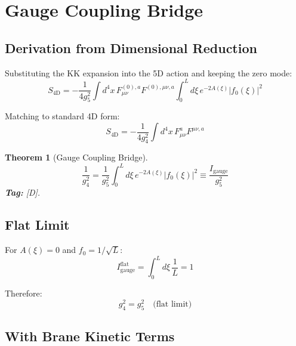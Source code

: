 \documentclass[11pt,a4paper]{article}
\newtheorem{theorem}{Theorem}[section]
\begin{document}
\section{Gauge Coupling Bridge}
\label{sec:coupling-bridge}

\subsection{Derivation from Dimensional Reduction}

Substituting the KK expansion into the 5D action and keeping the zero mode:
\begin{equation}
  S_{\text{4D}} = -\frac{1}{4g_5^2} \int d^4x \, F_{\mu\nu}^{(0),a} F^{(0),\mu\nu,a}
    \int_0^L d\xi \, e^{-2A(\xi)} |f_0(\xi)|^2
  \label{eq:4d-action-raw}
\end{equation}

Matching to standard 4D form:
\begin{equation}
  S_{\text{4D}} = -\frac{1}{4g_4^2} \int d^4x \, F_{\mu\nu}^a F^{\mu\nu,a}
  \label{eq:4d-standard}
\end{equation}

\begin{theorem}[Gauge Coupling Bridge]
\label{thm:gauge-bridge}
\begin{equation}
  \boxed{\frac{1}{g_4^2} = \frac{1}{g_5^2} \int_0^L d\xi \, e^{-2A(\xi)} |f_0(\xi)|^2
    \equiv \frac{I_{\text{gauge}}}{g_5^2}}
  \label{eq:gauge-bridge}
\end{equation}
\textbf{Tag:} [D].
\end{theorem}

\subsection{Flat Limit}

For $A(\xi) = 0$ and $f_0 = 1/\sqrt{L}$:
\begin{equation}
  I_{\text{gauge}}^{\text{flat}} = \int_0^L d\xi \, \frac{1}{L} = 1
  \label{eq:igauge-flat}
\end{equation}

Therefore:
\begin{equation}
  g_4^2 = g_5^2 \quad \text{(flat limit)}
  \label{eq:g4-flat}
\end{equation}

\subsection{With Brane Kinetic Terms}
\end{document}
